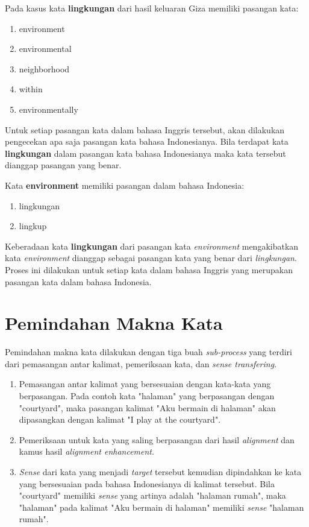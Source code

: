 Pada kasus kata \textbf{lingkungan} dari hasil keluaran Giza memiliki pasangan kata:

\begin{enumerate}
	\item environment
	\item environmental
	\item neighborhood
	\item within
	\item environmentally
\end{enumerate}

Untuk setiap pasangan kata dalam bahasa Inggris tersebut, akan dilakukan pengecekan apa saja pasangan kata bahasa Indonesianya. Bila terdapat kata \textbf{lingkungan} dalam pasangan kata bahasa Indonesianya maka kata tersebut dianggap pasangan yang benar.

Kata \textbf{environment} memiliki pasangan dalam bahasa Indonesia:

\begin{enumerate}
	\item lingkungan
	\item lingkup
\end{enumerate}

Keberadaan kata \textbf{lingkungan} dari pasangan kata \textit{environment} mengakibatkan kata \textit{environment} dianggap sebagai pasangan kata yang benar dari \textit{lingkungan}. Proses ini dilakukan untuk setiap kata dalam bahasa Inggris yang merupakan pasangan kata dalam bahasa Indonesia.
\section{Pemindahan Makna Kata} \label{sec:Pemindahan Makna Kata}
Pemindahan makna kata dilakukan dengan tiga buah \textit{sub-process} yang terdiri dari pemasangan antar kalimat, pemeriksaan kata, dan \textit{sense transfering}.
\begin{enumerate}
	\item Pemasangan antar kalimat yang bersesuaian dengan kata-kata yang berpasangan. Pada contoh kata "halaman" yang berpasangan dengan "courtyard", maka pasangan kalimat "Aku bermain di halaman" akan dipasangkan dengan kalimat "I play at the courtyard".
	\item Pemeriksaan untuk kata yang saling berpasangan dari hasil \textit{alignment} dan kamus hasil \textit{alignment enhancement}.
	\item \textit{Sense} dari kata yang menjadi \textit{target} tersebut kemudian dipindahkan ke kata yang bersesuaian pada bahasa Indonesianya di kalimat tersebut. Bila "courtyard" memiliki \textit{sense} yang artinya adalah "halaman rumah", maka "halaman" pada kalimat "Aku bermain di halaman" memiliki \textit{sense} "halaman rumah".
\end{enumerate}

